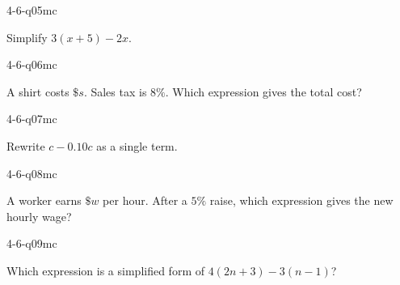 \begin{practiceQuestion}{4-6-q05}{mc}
\begin{questionText}
Simplify $3(x + 5) - 2x$.
\end{questionText}
\end{practiceQuestion}

\begin{practiceQuestion}{4-6-q06}{mc}
\begin{questionText}
A shirt costs $\$s$. Sales tax is $8\%$. Which expression gives the total cost?
\end{questionText}
\end{practiceQuestion}

\begin{practiceQuestion}{4-6-q07}{mc}
\begin{questionText}
Rewrite $c - 0.10c$ as a single term.
\end{questionText}
\end{practiceQuestion}

\begin{practiceQuestion}{4-6-q08}{mc}
\begin{questionText}
A worker earns $\$w$ per hour. After a $5\%$ raise, which expression gives the new hourly wage?
\end{questionText}
\end{practiceQuestion}

\begin{practiceQuestion}{4-6-q09}{mc}
\begin{questionText}
Which expression is a simplified form of $4(2n + 3) - 3(n - 1)$?
\end{questionText}
\end{practiceQuestion}

